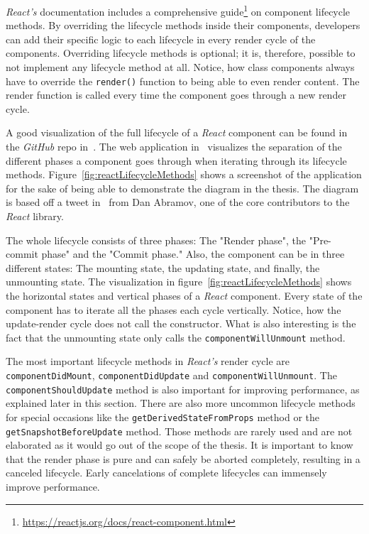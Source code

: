 \emph{React's} documentation includes a comprehensive guide\footnote{\url{https://reactjs.org/docs/react-component.html}} on component lifecycle methods. By overriding the lifecycle methods inside their components, developers can add their specific logic to each lifecycle in every render cycle of the components. Overriding lifecycle methods is optional; it is, therefore, possible to not implement any lifecycle method at all. Notice, how class components always have to override the \texttt{render()} function to being able to even render content. The render function is called every time the component goes through a new render cycle.

A good visualization of the full lifecycle of a \emph{React} component can be found in the \emph{GitHub} repo in~\cite{ReactRenderCycleGithub}. The web application in~\cite{ReactRenderCycleDiagram} visualizes the separation of the different phases a component goes through when iterating through its lifecycle methods. Figure~\ref{fig:reactLifecycleMethods} shows a screenshot of the application for the sake of being able to demonstrate the diagram in the thesis. The diagram is based off a tweet in~\cite{ReactCycleTweet} from Dan Abramov, one of the core contributors to the \emph{React} library.

The whole lifecycle consists of three phases: The "Render phase", the "Pre-commit phase" and the "Commit phase." Also, the component can be in three different states: The mounting state, the updating state, and finally, the unmounting state. The visualization in figure~\ref{fig:reactLifecycleMethods} shows the horizontal states and vertical phases of a \emph{React} component. Every state of the component has to iterate all the phases each cycle vertically. Notice, how the update-render cycle does not call the constructor. What is also interesting is the fact that the unmounting state only calls the \texttt{componentWillUnmount} method.

The most important lifecycle methods in \emph{React's} render cycle are \texttt{component\-Did\-Mount}, \texttt{component\-Did\-Update} and \texttt{component\-Will\-Unmount}. The \texttt{component\-Should\-Up\-date} method is also important for improving performance, as explained later in this section. There are also more uncommon lifecycle methods for special occasions like the \texttt{getDerivedStateFromProps} method or the \texttt{getSnapshotBeforeUpdate} method. Those methods are rarely used and are not elaborated as it would go out of the scope of the thesis. It is important to know that the render phase is pure and can safely be aborted completely, resulting in a canceled lifecycle. Early cancelations of complete lifecycles can immensely improve performance.

